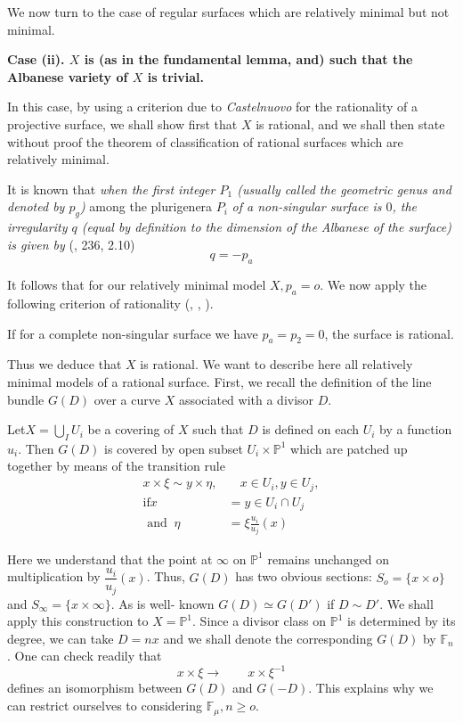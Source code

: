 We now turn to the case of regular surfaces which are relatively
minimal but not minimal. 

\noindent
\textbf{Case (ii). $X$ is (as in the fundamental lemma, and) such that
  the Albanese variety of $X$ is trivial.} 

In this case, by using a criterion due to \textit{Castelnuovo} for
the rationality of a projective surface, we shall show first that $X$
is rational, and we shall then state without proof the theorem of
classification of rational surfaces which are relatively minimal. 

It is known that \textit{when the first integer $P_1$ (usually called
  the geometric genus and denoted by $p_g$)} among the plurigenera
$P_i$ \textit{of a non-singular surface is $0$, the irregularity $q$
  (equal by definition to the dimension of the Albanese of the
  surface) is given by} (\cite{key8}, 236, 2.10) 
$$
q=-p_a
$$  

It follows that for our relatively minimal model $X,p_a=o$. We now
apply the following criterion of rationality (\cite{key2},
\cite{key24}, \cite{key25}). 

\begin{theorem*}[(Castelnuovo)]%
  If for a complete non-singular surface we have $p_a=p_2=0$, the
  surface is rational. 
\end{theorem*}

Thus we deduce that $X$ is rational. We want to describe here all
relatively minimal models of a rational surface. First, we recall the
definition of the line bundle $G(D)$ over a curve $X$ associated with
a divisor $D$. 

Let\pageoriginale $X= \bigcup\limits_I U_i$ be a covering of $X$ such that $D$ is
defined on each $U_i$ by a function $u_i$. Then $G(D)$ is covered by
open subset $U_i \times \mathbb{P}^1$ which are patched up together by means
of the transition rule 
\begin{align*}
  x \times \xi \sim y \times \eta, &  \quad x \in U_i, y \in U_j,\\
  \text {if} x &= y \in U_i \cap U_j\\
  \text { and } ~\eta & = \xi \frac{u_i}{u_j}(x) \tag{3}
\end{align*}

Here we understand that the point at $\infty$ on $\mathbb{P}^1$
remains unchanged on multiplication by $\dfrac{u_i}{u_j}(x)$. Thus,
$G(D)$ has two obvious sections: $S_o=\{x \times o \}$ and
$S_\infty=\{x \times \infty \}$. As is well- known $G(D)\simeq G(D')$
if $D \sim D'$. We shall apply this construction to
$X=\mathbb{P}^1$. Since a divisor class on $\mathbb{P}^1$  is
determined by its degree, we can take $D=nx$ and we shall denote the
corresponding $G(D)$ by $\mathbb{F}_n$. One can check readily that 
$$
x \times \xi \longrightarrow \qquad x \times \xi^{-1}
$$  
defines an isomorphism between $G(D)$ and $G(-D)$. This explains why we
can restrict ourselves to considering $\mathbb{F}_\mu,n \ge o$. 

